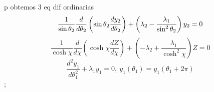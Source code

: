 \documentclass[a4paper,12pt]{article}
\begin{document}
p obtemos 3 eq dif ordinarias%
\begin{equation*}
\frac{1}{\sin \theta _{2}}\frac{d}{d\theta _{2}}\left( \sin \theta _{2}\frac{%
dy_{2}}{d\theta _{2}}\right) +\left( \lambda _{2}-\frac{\lambda _{1}}{\sin
^{2}\theta _{2}}\right) y_{2}=0
\end{equation*}%
\begin{equation*}
\frac{1}{\cosh \chi }\frac{d}{d\chi }\left( \cosh \chi \frac{dZ}{d\chi }%
\right) +\left( -\lambda _{2}+\frac{\lambda _{1}}{\cosh ^{2}\chi }\right) Z=0
\end{equation*}%
\begin{equation*}
\frac{d^{2}y_{1}}{d\theta _{1}^{2}}+\lambda _{1}y_{1}=0,\ y_{1}\left( \theta
_{1}\right) =y_{1}\left( \theta _{1}+2\pi \right) 
\end{equation*}%
;
\end{document}

